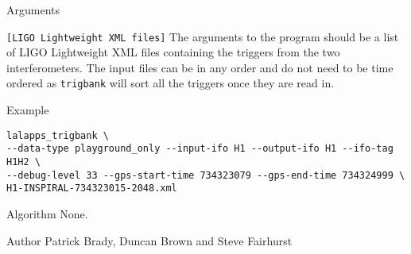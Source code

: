 \begin{entry}
\begin{entry}
\end{entry}

\item[Arguments]\leavevmode
\begin{entry}
\item[\texttt{[LIGO Lightweight XML files]}] The arguments to the program
should be a list of LIGO Lightweight XML files containing the triggers from the
two interferometers. The input files can be in any order and do not need to be
time ordered as \texttt{trigbank} will sort all the triggers once they are read
in. 
\end{entry}

\item[Example]
\begin{verbatim}
lalapps_trigbank \
--data-type playground_only --input-ifo H1 --output-ifo H1 --ifo-tag H1H2 \
--debug-level 33 --gps-start-time 734323079 --gps-end-time 734324999 \
H1-INSPIRAL-734323015-2048.xml
\end{verbatim}

\item[Algorithm]
None.

\item[Author] 
Patrick Brady, Duncan Brown and Steve Fairhurst
\end{entry}


